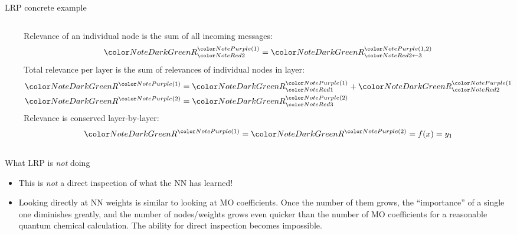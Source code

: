 \documentclass[compress]{beamer}
\makeatletter
\def\mathcolor#1#{\@mathcolor{#1}}
\def\@mathcolor#1#2#3{%
  \protect\leavevmode
  \begingroup
    \color#1{#2}#3%
  \endgroup
}
\makeatother
\begin{document}
\begin{frame}{LRP concrete example}
\begin{columns}
\begin{column}{0.5\textwidth}
\begin{align*}
      \end{align*}
    \end{column}
    \begin{column}{0.5\textwidth}
      Relevance of an individual node is the sum of all incoming messages:
      \begin{equation*}
        \mathcolor{NoteDarkGreen}{R}_{\mathcolor{NoteRed}{2}}^{\mathcolor{NotePurple}{(1)}} = \mathcolor{NoteDarkGreen}{R}_{\mathcolor{NoteRed}{2\leftarrow 3}}^{\mathcolor{NotePurple}{(1,2)}}
      \end{equation*}
      Total relevance per layer is the sum of relevances of individual nodes in layer:
      \begin{align*}
        \mathcolor{NoteDarkGreen}{R}^{\mathcolor{NotePurple}{(1)}} &= \mathcolor{NoteDarkGreen}{R}_{\mathcolor{NoteRed}{1}}^{\mathcolor{NotePurple}{(1)}} + \mathcolor{NoteDarkGreen}{R}_{\mathcolor{NoteRed}{2}}^{\mathcolor{NotePurple}{(1)}} \\
        \mathcolor{NoteDarkGreen}{R}^{\mathcolor{NotePurple}{(2)}} &= \mathcolor{NoteDarkGreen}{R}_{\mathcolor{NoteRed}{3}}^{\mathcolor{NotePurple}{(2)}}
      \end{align*}
      Relevance is conserved layer-by-layer:
      \begin{equation*}
        \mathcolor{NoteDarkGreen}{R}^{\mathcolor{NotePurple}{(1)}} = \mathcolor{NoteDarkGreen}{R}^{\mathcolor{NotePurple}{(2)}} = f(x) = y_1
      \end{equation*}
    \end{column}
  \end{columns}
\end{frame}

\begin{frame}{What LRP is \protect\emph{not} doing}
  \begin{itemize}
    \item This is \emph{not} a direct inspection of what the NN has learned!
    \item Looking directly at NN weights is similar to looking at MO coefficients. Once the number of them grows, the ``importance'' of a single one diminishes greatly, and the number of nodes/weights grows even quicker than the number of MO coefficients for a reasonable quantum chemical calculation. The ability for direct inspection becomes impossible.
  \end{itemize}
\end{frame}
\end{document}
